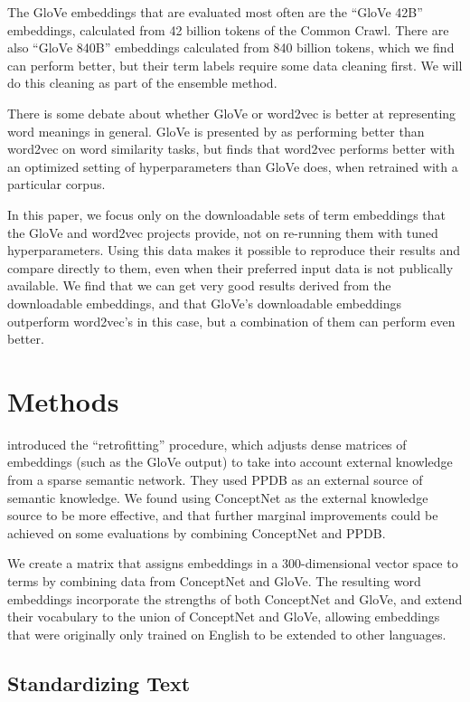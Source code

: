 \documentclass[11pt,letterpaper]{article}
\begin{document}
The GloVe embeddings that are evaluated most often are the ``GloVe 42B''
embeddings, calculated from 42 billion tokens of the Common Crawl. There are
also ``GloVe 840B'' embeddings calculated from 840 billion tokens, which we
find can perform better, but their term labels require some data cleaning first.
We will do this cleaning as part of the ensemble method.

There is some debate about whether GloVe or word2vec is better at representing
word meanings in general. GloVe is presented by 
as performing better than word2vec on word similarity tasks, but
 finds that word2vec performs better with an
optimized setting of hyperparameters than GloVe does, when retrained with a
particular corpus.

In this paper, we focus only on the downloadable sets of term embeddings that
the GloVe and word2vec projects provide, not on re-running them with tuned
hyperparameters. Using this data makes it possible to reproduce their results
and compare directly to them, even when their preferred input data is not
publically available. We find that we can get very good results derived from
the downloadable embeddings, and that GloVe's downloadable embeddings outperform
word2vec's in this case, but a combination of them can perform even better.

\section{Methods}

 introduced the ``retrofitting'' procedure,
which adjusts dense matrices of embeddings (such as the GloVe output) to take
into account external knowledge from a sparse semantic network. They used PPDB
\cite{ganitkevitch2013ppdb} as an external source of semantic knowledge. We
found using ConceptNet as the external knowledge source to be more effective,
and that further marginal improvements could be achieved on some evaluations by
combining ConceptNet and PPDB.

We create a matrix that assigns embeddings in a 300-dimensional vector
space to terms by combining data from ConceptNet and GloVe. The resulting word
embeddings incorporate the strengths of both ConceptNet and GloVe, and extend
their vocabulary to the union of ConceptNet and GloVe, allowing embeddings that
were originally only trained on English to be extended to other languages.

\subsection{Standardizing Text}
\end{document}
